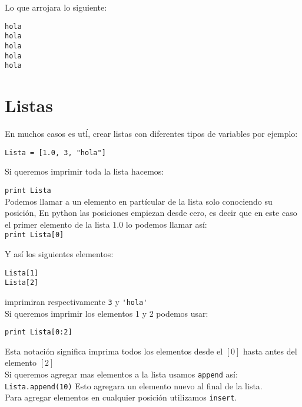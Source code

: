 \documentclass[12pt]{article}
\begin{document}
Lo que arrojara lo siguiente:

\begin{verbatim}
hola
hola
hola
hola
hola
\end{verbatim}

\section{Listas}

En muchos casos es ut\'l, crear listas con diferentes tipos de variables por ejemplo: 

\begin{verbatim}
Lista = [1.0, 3, "hola"]
\end{verbatim}

Si queremos imprimir toda la lista hacemos: 

\verb"print Lista" \\

Podemos llamar a un elemento en part\'icular de la lista solo conociendo su posici\'on, En python las posiciones empiezan desde
cero, es decir que en este caso el primer elemento de la lista $1.0$ lo podemos llamar as\'i:\\

\verb"print Lista[0]" 

Y as\'i los siguientes elementos:\\

\begin{verbatim}
Lista[1]
Lista[2] 
\end{verbatim}

imprimiran respectivamente \verb"3" y \verb"'hola'" \\

Si queremos imprimir los elementos 1 y 2 podemos usar: 

\begin{verbatim}
print Lista[0:2]
\end{verbatim}

Esta notaci\'on significa imprima  todos los elementos desde el $[0]$ hasta antes del elemento $[2]$ \\

Si queremos agregar mas elementos a la lista usamos \verb+append+ as\'i:\\

\verb+Lista.append(10)+ Esto agregara un elemento nuevo al final de la lista.\\

Para agregar elementos en cualquier posici\'on utilizamos \verb+insert+. \\
\end{document}
